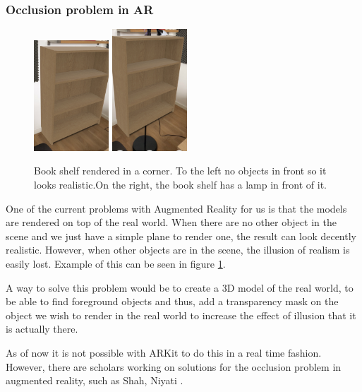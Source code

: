 \subsubsection{Occlusion problem in AR}
\begin{figure}[hbtp]
\begin{center}
\includegraphics[width = 0.25\textwidth]{./Images/overlapping2.jpg} 
\includegraphics[width = 0.25\textwidth]{./Images/overlapping1.jpg} 
\caption{Book shelf rendered in a corner. To the left no objects in front so it looks realistic.On the right, the book shelf has a lamp in front of it.}
\label{fig:occlusion}
\end{center}
\end{figure}

One of the current problems with Augmented Reality for us is that the models are rendered on top of the real world. When there are no other object in the scene and we just have a simple plane to render one, the result can look decently realistic. However, when other objects are in the scene, the  illusion of realism is easily lost. Example of this can be seen in figure \ref{fig:occlusion}. 

A way to solve this problem would be to create a 3D model of the real world, to be able to find foreground objects and thus, add a transparency mask on the object we wish to render in the real world to increase the effect of illusion that it is actually there.

As of now it is not possible with ARKit to do this in a real time fashion. However, there are scholars working on solutions for the occlusion problem in augmented reality, such as Shah, Niyati \cite{occlusion}.

\newpage
